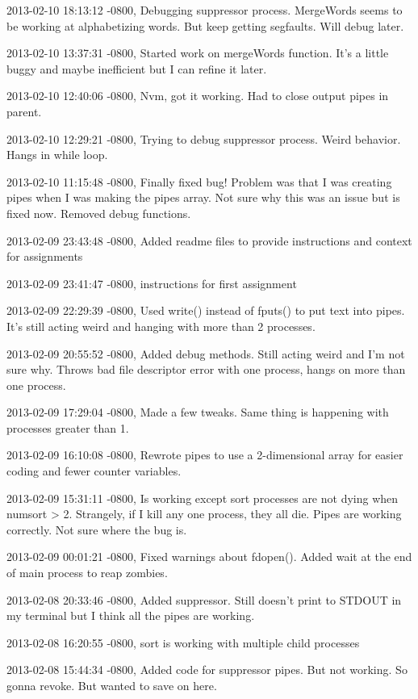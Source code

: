 \documentclass[letterpaper,10pt,titlepage]{article}
\begin{document}
\begin{enumerate}
2013-02-10 18:13:12 -0800, Debugging suppressor process. MergeWords seems to be working at alphabetizing words. But keep getting segfaults. Will debug later.

2013-02-10 13:37:31 -0800, Started work on mergeWords function. It's a little buggy and maybe inefficient but I can refine it later.

2013-02-10 12:40:06 -0800, Nvm, got it working. Had to close output pipes in parent.

2013-02-10 12:29:21 -0800, Trying to debug suppressor process. Weird behavior. Hangs in while loop.

2013-02-10 11:15:48 -0800, Finally fixed bug! Problem was that I was creating pipes when I was making the pipes array. Not sure why this was an issue but is fixed now. Removed debug functions.

2013-02-09 23:43:48 -0800, Added readme files to provide instructions and context for assignments

2013-02-09 23:41:47 -0800, instructions for first assignment

2013-02-09 22:29:39 -0800, Used write() instead of fputs() to put text into pipes. It's still acting weird and hanging with more than 2 processes.

2013-02-09 20:55:52 -0800, Added debug methods. Still acting weird and I'm not sure why. Throws bad file descriptor error with one process, hangs on more than one process.

2013-02-09 17:29:04 -0800, Made a few tweaks. Same thing is happening with processes greater than 1.

2013-02-09 16:10:08 -0800, Rewrote pipes to use a 2-dimensional array for easier coding and fewer counter variables.

2013-02-09 15:31:11 -0800, Is working except sort processes are not dying when numsort > 2. Strangely, if I kill any one process, they all die. Pipes are working correctly. Not sure where the bug is.

2013-02-09 00:01:21 -0800, Fixed warnings about fdopen(). Added wait at the end of main process to reap zombies.

2013-02-08 20:33:46 -0800, Added suppressor. Still doesn't print to STDOUT in my terminal but I think all the pipes are working.

2013-02-08 16:20:55 -0800, sort is working with multiple child processes

2013-02-08 15:44:34 -0800, Added code for suppressor pipes. But not working. So gonna revoke. But wanted to save on here.


\end{enumerate}
\end{document}
